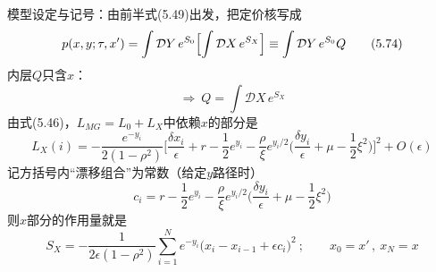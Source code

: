 模型设定与记号：由前半式(5.49)出发，把定价核写成
\begin{equation*}
p(x,y;\tau,x')=\int\mathcal{D}Y\,e^{S_{0}}
\Bigl[\int\mathcal{D}X\,e^{S_{X}}\Bigr]\equiv\int\mathcal{D}Y\,e^{S_{0}}Q
\tag{5.74}
\end{equation*}
内层$Q$只含$x$：
\begin{equation*}
\Rightarrow\ Q=\int\mathcal{D}X\,e^{S_{X}}
\tag{5.75}
\end{equation*}
由式(5.46)，$L_{MG}=L_{0}+L_{X}$中依赖$x$的部分是
\begin{equation*}
L_{X}(i)=-\frac{e^{-y_i}}{2(1-\rho^{2})}\biggl[\frac{\delta x_i}{\epsilon}
+r-\frac{1}{2}e^{y_i}
-\frac{\rho}{\xi}e^{y_i/2}\biggl(\frac{\delta y_i}{\epsilon}
+\mu-\frac{1}{2}\xi^{2}\biggr)\biggr]^{2}+O(\epsilon)
\tag{5.76}
\end{equation*}
记方括号内“漂移组合”为常数（给定$y$路径时）
\begin{equation*}
c_i=r-\frac{1}{2}e^{y_i}
-\frac{\rho}{\xi}e^{y_i/2}\biggl(\frac{\delta y_i}{\epsilon}
+\mu-\frac{1}{2}\xi^{2}\biggr)
\end{equation*}
则$x$部分的作用量就是
\begin{equation*}
S_{X}=-\frac{1}{2\epsilon(1-\rho^{2})}\sum_{i=1}^{N}
e^{-y_i}\bigl(x_i-x_{i-1}+\epsilon c_i\bigr)^{2}\ ;
\qquad x_0=x'\,,\ x_N=x
\tag{5.77}
\end{equation*}

